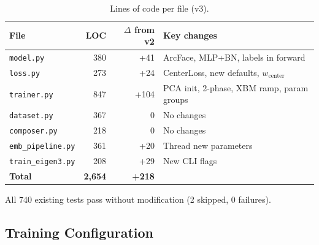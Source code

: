 \documentclass[11pt,a4paper]{article}
\begin{document}
\begin{table}[H]
\centering
\caption{Lines of code per file (v3).}
\begin{tabular}{lrrl}
\toprule
\textbf{File} & \textbf{LOC} & \textbf{$\Delta$ from v2} & \textbf{Key changes} \\
\midrule
\texttt{model.py} & 380 & +41 & ArcFace, MLP+BN, labels in forward \\
\texttt{loss.py} & 273 & +24 & CenterLoss, new defaults, $w_{\text{center}}$ \\
\texttt{trainer.py} & 847 & +104 & PCA init, 2-phase, XBM ramp, param groups \\
\texttt{dataset.py} & 367 & 0 & No changes \\
\texttt{composer.py} & 218 & 0 & No changes \\
\texttt{emb\_pipeline.py} & 361 & +20 & Thread new parameters \\
\texttt{train\_eigen3.py} & 208 & +29 & New CLI flags \\
\midrule
\textbf{Total} & \textbf{2{,}654} & \textbf{+218} & \\
\bottomrule
\end{tabular}
\end{table}

All 740 existing tests pass without modification (2 skipped, 0 failures).

\subsection{Training Configuration}
\end{document}
